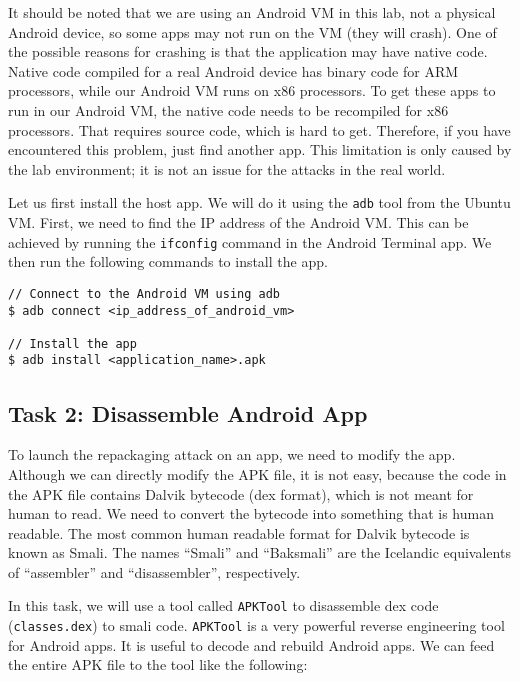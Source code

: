 It should be noted that we are using an Android VM in this lab, not a physical Android device,
so some apps may not run on the VM (they will crash). One of the possible reasons for crashing
is that the application may have native code. Native code compiled for a real Android device
has binary code for ARM processors, while our Android VM runs on x86 processors. To get these
apps to run in our Android VM, the native code needs to be recompiled for x86 processors. That
requires source code, which is hard to get.  Therefore, if you have encountered this problem,
just find another app. This limitation is only caused by the lab environment; it is not an
issue for the attacks in the real world.


Let us first install the host app. We will do it using the \texttt{adb} tool from the Ubuntu
VM. First, we need to find the IP address of the Android VM. This can be achieved by running
the \texttt{ifconfig} command in the Android Terminal app. We then run the following commands
to install the app.


\begin{lstlisting}
// Connect to the Android VM using adb
$ adb connect <ip_address_of_android_vm>

// Install the app
$ adb install <application_name>.apk
\end{lstlisting}




\subsection{Task 2: Disassemble Android App}

To launch the repackaging attack on an app, we need to modify the app. Although we can 
directly modify the APK file, it is not easy, because the code 
in the APK file contains Dalvik bytecode (dex format), which is not meant for human to read. We need to
convert the bytecode into something that is human readable. The most common human readable
format for Dalvik bytecode is known as Smali.  The names ``Smali'' and ``Baksmali''
are the Icelandic equivalents of ``assembler'' and ``disassembler'', respectively.

In this task, we will use a tool called \texttt{APKTool} to disassemble dex 
code (\texttt{classes.dex})
to smali code. \texttt{APKTool} is a very powerful reverse engineering tool for Android apps. It
is useful to decode and rebuild Android apps. 
We can feed the entire APK file to the tool like the following:

